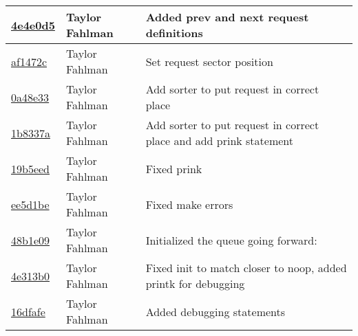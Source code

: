 \begin{tabular}{l l l}
\href{https://github.com/fahlmant/cs444/commit/4e4e0d50bb79cb0287dd9e15bf858950aca4e52c}{4e4e0d5} & Taylor Fahlman & Added prev and next request definitions\\\hline
\href{https://github.com/fahlmant/cs444/commit/af1472c36acd59ba67588633806bf0893cfe8b8b}{af1472c} & Taylor Fahlman & Set request sector position\\\hline
\href{https://github.com/fahlmant/cs444/commit/0a48e33e7e336bcfa08225cb01f3df0fcaaed1f8}{0a48e33} & Taylor Fahlman & Add sorter to put request in correct place\\\hline
\href{https://github.com/fahlmant/cs444/commit/1b8337adbfd556c19331c13e47fdf30f6be4aa2c}{1b8337a} & Taylor Fahlman & Add sorter to put request in correct place and add prink statement\\\hline
\href{https://github.com/fahlmant/cs444/commit/19b5eed5fce8f0988d6de8e32433e71ec722f401}{19b5eed} & Taylor Fahlman & Fixed prink\\\hline
\href{https://github.com/fahlmant/cs444/commit/ee5d1be765a4359e795c1cfab79f45e7157dc427}{ee5d1be} & Taylor Fahlman & Fixed make errors\\\hline
\href{https://github.com/fahlmant/cs444/commit/48b1e091f6f8445fc355268ded9d2ab085f38217}{48b1e09} & Taylor Fahlman & Initialized the queue going forward:\\\hline
\href{https://github.com/fahlmant/cs444/commit/4e313b07a7ce52c2eeb15e77780b0344fd58e776}{4e313b0} & Taylor Fahlman & Fixed init to match closer to noop, added printk for debugging\\\hline
\href{https://github.com/fahlmant/cs444/commit/16dfafe2b2ddaa55c00dc6f13d1624f5f348abdc}{16dfafe} & Taylor Fahlman & Added debugging statements\\\hline\end{tabular}
